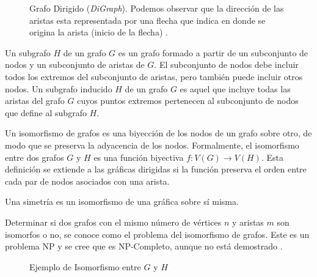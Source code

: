  \begin{figure}[htbp]
   \centering
   
    \caption{Grafo Dirigido (\textit{DiGraph}). Podemos observar que la dirección de las aristas esta representada por una flecha que indica en donde se origina la arista (inicio de la flecha) .}
    \label{fig:digraph}
\end{figure}

Un subgrafo $H$ de un grafo $G$ es un grafo formado a partir de un subconjunto de nodos y un subconjunto de aristas de $G$. El subconjunto de nodos debe incluir todos los extremos del subconjunto de aristas, pero también puede incluir otros nodos. Un subgrafo inducido $H$ de un grafo $G$ es aquel que incluye todas las aristas del grafo $G$ cuyos puntos extremos pertenecen al subconjunto de nodos que define al subgrafo $H$.

Un isomorfismo de grafos es una biyección de los nodos de un grafo sobre otro, de modo que se preserva la adyacencia de los nodos. Formalmente, el isomorfismo entre dos grafos $G$ y $H$ es una función biyectiva  $f:V(G) \rightarrow V(H)$. Esta definición se extiende a las gráficas dirigidas si la función preserva el orden entre cada par de nodos asociados con una arista. 

Una simetría es un isomorfismo de una gráfica sobre sí misma.

Determinar si dos grafos con el mismo número de vértices $n$ y aristas $m$ son isomorfos o no, se conoce como el problema del isomorfismo de grafos. Este es un problema NP y se cree que es NP-Completo, aunque no está demostrado \cite{kobler_graph_1993}.

\label{subsection:isomorphism}

 \begin{figure}[htbp]
   \centering
   
    \caption{Ejemplo de Isomorfismo entre $G$ y $H$}
    \label{fig:isomorphism}
\end{figure}

 



